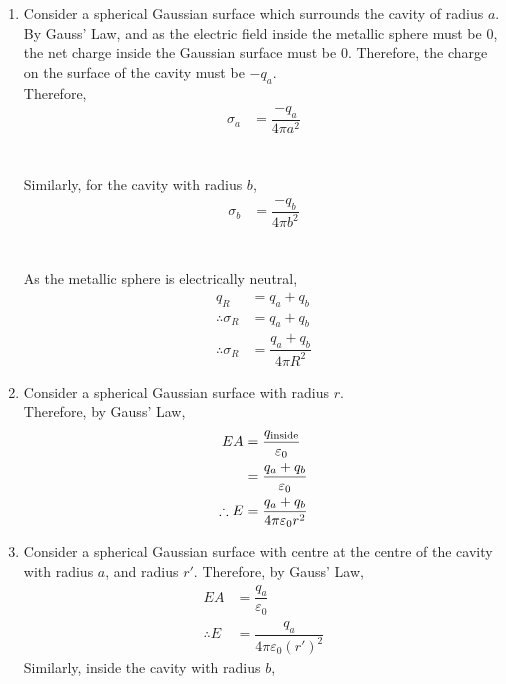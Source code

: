 \documentclass[fleqn, a4paper, 11pt, oneside]{amsart}
\theoremstyle{definition}
\theoremstyle{theorem}
\begin{document}
\begin{solution}
	\begin{enumerate}[leftmargin=*]
		\item 
			Consider a spherical Gaussian surface which surrounds the cavity of radius $a$.
			By Gauss' Law, and as the electric field inside the metallic sphere must be $0$, the net charge inside the Gaussian surface must be $0$.
			Therefore, the charge on the surface of the cavity must be $-q_a$.\\
			Therefore,
			\begin{align*}
				\sigma_a &= \dfrac{-q_a}{4 \pi a^2}
			\end{align*}\\
			~\\
			Similarly, for the cavity with radius $b$,
			\begin{align*}
				\sigma_b &= \dfrac{-q_b}{4 \pi b^2}
			\end{align*}\\
			~\\
			As the metallic sphere is electrically neutral,
			\begin{align*}
				q_R                 & = q_a + q_b \\
				\therefore \sigma_R & = q_a + q_b \\
				\therefore \sigma_R & = \dfrac{q_a + q_b}{4 \pi R^2}
			\end{align*}
		\item
			Consider a spherical Gaussian surface with radius $r$.\\
			Therefore, by Gauss' Law,
			\begin{align*}
				E A          & = \dfrac{q_{\textnormal{inside}}}{\varepsilon_0} \\
                                             & = \dfrac{q_a + q_b}{\varepsilon_0}               \\
				\therefore E & = \dfrac{q_a + q_b}{4 \pi \varepsilon_0 r^2}
       		\end{align*}
		\item
			Consider a spherical Gaussian surface with centre at the centre of the cavity with radius $a$, and radius $r'$.
			Therefore, by Gauss' Law,
			\begin{align*}
				E A          & = \dfrac{q_a}{\varepsilon_0} \\
				\therefore E & = \dfrac{q_a}{4 \pi \varepsilon_0 (r')^2}
			\end{align*}
			Similarly, inside the cavity with radius $b$,
			\begin{align*}

\end{align*}
\end{enumerate}
\end{solution}
\end{document}
